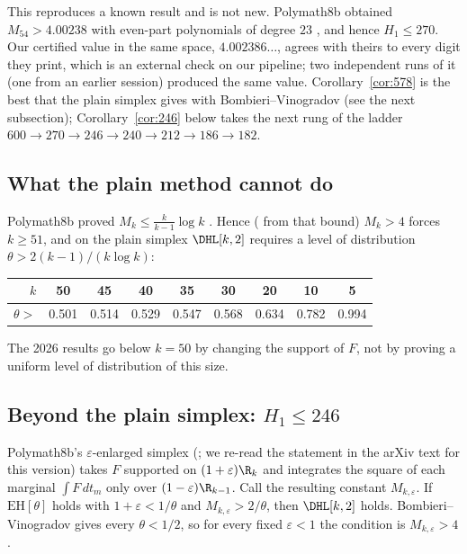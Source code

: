 This reproduces a known result and is not new. Polymath8b obtained
$M_{54}>4.00238$ with even-part polynomials of degree $23$
\cite[Thm.~3.9]{Pol14b}, and hence $H_1\le270$. Our certified value in the
same space, $4.002386\ldots$, agrees with theirs to every digit they print,
which is an external check on our pipeline; two independent runs of it (one
from an earlier session) produced the same value. Corollary~\ref{cor:578}
is the best that the plain simplex gives with Bombieri--Vinogradov (see the
next subsection); Corollary~\ref{cor:246} below takes the next rung of the
ladder $600\to270\to246\to240\to212\to186\to182$.

\subsection{What the plain method cannot do}
Polymath8b proved $M_k\le\frac{k}{k-1}\log k$ \cite{Pol14b}. Hence
( from that bound) $M_k>4$ forces $k\ge51$, and on the plain
simplex $\DHL[k,2]$ requires a level of distribution
$\theta>2(k-1)/(k\log k)$:
\begin{center}
\begin{tabular}{@{}rcccccccc@{}}
\toprule
$k$ & 50 & 45 & 40 & 35 & 30 & 20 & 10 & 5\\
\midrule
$\theta>$ & 0.501 & 0.514 & 0.529 & 0.547 & 0.568 & 0.634 & 0.782 & 0.994\\
\bottomrule
\end{tabular}
\end{center}
The 2026 results go below $k=50$ by changing the support of $F$, not by
proving a uniform level of distribution of this size.

\subsection{Beyond the plain simplex: \texorpdfstring{$H_1\le246$}{H1 <= 246}}
Polymath8b's $\varepsilon$-enlarged simplex \cite[Thm.~3.12]{Pol14b}
(; we re-read the statement in the arXiv text for this
version) takes $F$ supported on $(1+\varepsilon)\R_k$ and integrates the
square of each marginal $\int F\,dt_m$ only over $(1-\varepsilon)\R_{k-1}$.
Call the resulting constant $M_{k,\varepsilon}$. If $\mathrm{EH}[\theta]$
holds with $1+\varepsilon<1/\theta$ and $M_{k,\varepsilon}>2/\theta$, then
$\DHL[k,2]$ holds. Bombieri--Vinogradov gives every $\theta<1/2$, so for
every fixed $\varepsilon<1$ the condition is $M_{k,\varepsilon}>4$.

